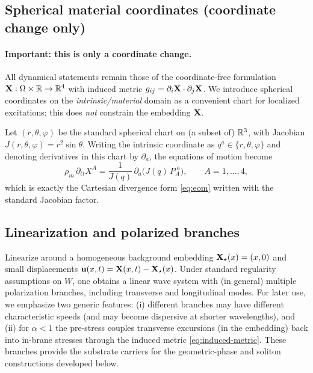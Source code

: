 \subsection{Spherical material coordinates (coordinate change only)}
\label{subsec:spherical-material-coords}

\paragraph{Important: this is only a coordinate change.}
All dynamical statements remain those of the coordinate-free formulation
$\mathbf{X}:\Omega\times\mathbb{R}\to\mathbb{R}^4$ with induced metric $g_{ij}=\partial_i\mathbf{X}\cdot\partial_j\mathbf{X}$.
We introduce spherical coordinates on the \emph{intrinsic/material} domain as a convenient chart for localized
excitations; this does \emph{not} constrain the embedding $\mathbf{X}$.

Let $(r,\theta,\varphi)$ be the standard spherical chart on (a subset of) $\mathbb{R}^3$, with Jacobian
$J(r,\theta,\varphi)=r^2\sin\theta$.
Writing the intrinsic coordinate as $q^a\in\{r,\theta,\varphi\}$ and denoting derivatives in this chart by $\partial_a$,
the equations of motion become
\begin{equation}
  \rho_m\,\partial_{tt}X^A
  =\frac{1}{J(q)}\,\partial_a\!\Big(J(q)\,P_A^{\;a}\Big),
  \qquad A=1,\dots,4,
  \label{eq:eom-spherical}
\end{equation}
which is exactly the Cartesian divergence form \eqref{eq:eom} written with the standard Jacobian factor.

\subsection{Linearization and polarized branches}

Linearize around a homogeneous background embedding $\mathbf{X}_\star(x)=(x,0)$ and small displacements
$\mathbf{u}(x,t)=\mathbf{X}(x,t)-\mathbf{X}_\star(x)$.
Under standard regularity assumptions on $W$, one obtains a linear wave system with (in general) multiple
polarization branches, including transverse and longitudinal modes.
For later use, we emphasize two generic features:
(i) different branches may have different characteristic speeds (and may become dispersive at shorter wavelengths),
and (ii) for $\alpha<1$ the pre-stress couples transverse excursions (in the embedding) back into in-brane stresses
through the induced metric \eqref{eq:induced-metric}.
These branches provide the substrate carriers for the geometric-phase and soliton constructions developed below.

